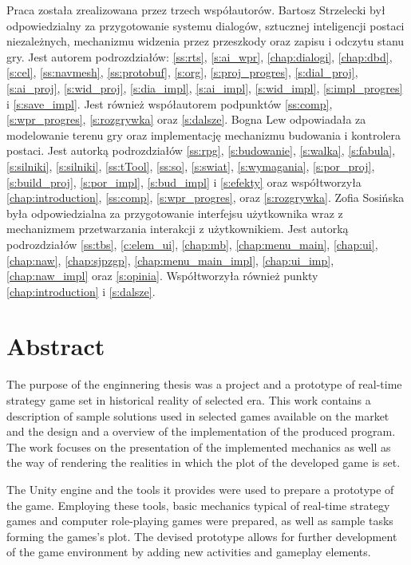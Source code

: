 Praca została zrealizowana przez trzech współautorów. Bartosz Strzelecki był odpowiedzialny za przygotowanie systemu
dialogów, sztucznej inteligencji postaci niezależnych, mechanizmu widzenia przez przeszkody oraz zapisu i odczytu stanu gry.
Jest autorem podrozdziałów: \ref{ss:rts},
\ref{s:ai_wpr}, \ref{chap:dialogi}, \ref{chap:dbd}, \ref{s:cel}, \ref{ss:navmesh}, \ref{ss:protobuf}, \ref{s:org}, \ref{s:proj_progres},
\ref{s:dial_proj}, \ref{s:ai_proj}, \ref{s:wid_proj}, \ref{s:dia_impl}, \ref{s:ai_impl}, \ref{s:wid_impl}, \ref{s:impl_progres} i
\ref{s:save_impl}. Jest również współautorem podpunktów \ref{ss:comp}, \ref{s:wpr_progres}, \ref{s:rozgrywka} oraz \ref{s:dalsze}.
Bogna Lew odpowiadała za modelowanie terenu gry oraz implementację mechanizmu budowania i kontrolera postaci. Jest autorką
podrozdziałów \ref{ss:rpg}, \ref{s:budowanie}, \ref{s:walka}, \ref{s:fabula}, \ref{s:silniki}, \ref{s:silniki},
\ref{ss:tTool}, \ref{ss:so}, \ref{s:swiat}, \ref{s:wymagania}, \ref{s:por_proj}, \ref{s:build_proj}, \ref{s:por_impl}, \ref{s:bud_impl} i
\ref{s:efekty} oraz współtworzyła \ref{chap:introduction}, \ref{ss:comp}, \ref{s:wpr_progres}, oraz \ref{s:rozgrywka}.
Zofia Sosińska była odpowiedzialna za przygotowanie interfejsu użytkownika wraz z mechanizmem przetwarzania interakcji z użytkownikiem. Jest
autorką podrozdziałów \ref{ss:tbs}, \ref{c:elem_ui}, \ref{chap:mb},
\ref{chap:menu_main}, \ref{chap:ui}, \ref{chap:naw}, \ref{chap:sjpzgp}, \ref{chap:menu_main_impl}, \ref{chap:ui_imp},
\ref{chap:naw_impl} oraz \ref{s:opinia}. Współtworzyła również punkty \ref{chap:introduction} i \ref{s:dalsze}.

\chapter*{Abstract}
The purpose of the enginnering thesis was a project and a prototype of real-time strategy game set in historical reality of selected era.
This work contains a description of sample solutions used in selected games available on the market
and the design and a overview of the implementation of the produced program. The work focuses on the presentation 
of the implemented mechanics as well as
the way of rendering the realities in which the plot of the developed game is set.

The Unity engine and the tools it provides were used to prepare a prototype of the game.
Employing these tools, basic mechanics typical of real-time strategy games and computer role-playing games were prepared,
as well as sample tasks forming the games's plot. The devised prototype allows for 
further development of the game environment by adding new activities and gameplay elements.

